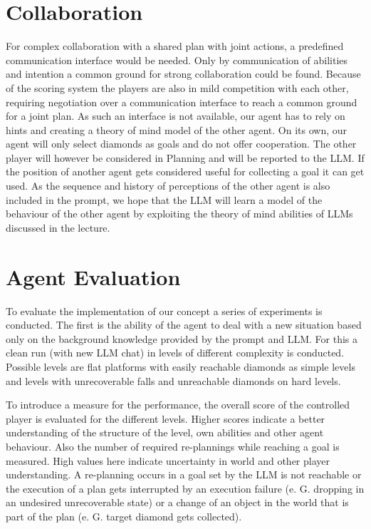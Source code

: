 \documentclass{article}
\begin{document}
\section{Collaboration}

For complex collaboration with a shared plan with joint actions, a predefined communication interface would be needed. 
Only by communication of abilities and intention a common ground for strong collaboration could be found. 
Because of the scoring system the players are also in mild competition with each other, requiring negotiation over a communication interface to reach a common ground for a joint plan.  
As such an interface is not available, our agent has to rely on hints and creating a theory of mind model of the other agent. 
On its own, our agent will only select diamonds as goals and do not offer cooperation. The other player will however be considered in Planning and will be reported to the LLM. If the position of another agent gets considered useful for collecting a goal it can get used. As the sequence and history of perceptions of the other agent is also included in the prompt, we hope that the LLM will learn a model of the behaviour of the other agent by exploiting the theory of mind abilities of LLMs discussed in the lecture.

\section{Agent Evaluation}

To evaluate the implementation of our concept a series of experiments is conducted.
The first is the ability of the agent to deal with a new situation based only on the background knowledge provided by the prompt and LLM. For this a clean run (with new LLM chat) in levels of different complexity is conducted.
Possible levels are flat platforms with easily reachable diamonds as simple levels and levels with unrecoverable falls and unreachable diamonds on hard levels. 

To introduce a measure for the performance, the overall score of the controlled player is evaluated for the different levels.
Higher scores indicate a better understanding of the structure of the level, own abilities and other agent behaviour.
Also the number of required re-plannings while reaching a goal is measured. High values here indicate uncertainty in world and other player understanding. A re-planning occurs in a goal set by the LLM is not reachable or the execution of a plan gets interrupted by an execution failure (e. G. dropping in an undesired unrecoverable state) or a change of an object in the world that is part of the plan (e. G. target diamond gets collected).
\end{document}
